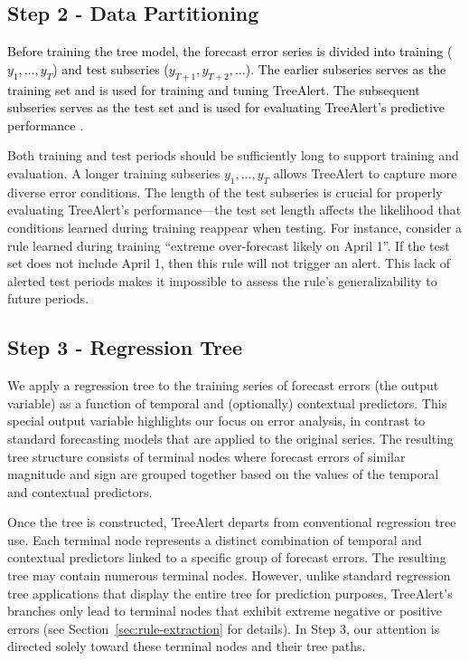 \documentclass[]{interact}
\newcommand{\matt}[1]{\textcolor{black}{#1}}
\theoremstyle{plain}
\theoremstyle{definition}
\theoremstyle{remark}
\begin{document}
\subsection{Step 2 - Data Partitioning}

\matt{Before training the tree model, the forecast error series is divided into training ($y_1, \ldots, y_T$) and test subseries ($y_{T+1}, y_{T+2}, \ldots$). The earlier subseries serves as the training set and is
used for training and tuning TreeAlert. The subsequent subseries serves as the test set and is used for evaluating TreeAlert's predictive performance \citep{shmueli2024}.}

Both training and test periods should be sufficiently long to support training and evaluation.
A longer training subseries $y_1, \ldots, y_T$ allows TreeAlert to capture more diverse error conditions.
The length of the test subseries is crucial for properly evaluating TreeAlert's performance---the test set length affects the likelihood that conditions learned during training reappear when testing. For instance, consider a rule learned during training ``extreme over-forecast likely on April 1''. If the test set does not include April 1, then this rule will not trigger an alert. This lack of alerted test periods makes it impossible to assess the rule's generalizability to future periods.

\subsection{Step 3 - Regression Tree}
We apply a regression tree to the training series of forecast errors (the output variable) as a function of temporal and (optionally) contextual predictors. This special output variable highlights our focus on error analysis, in contrast to standard forecasting models that are applied to the original series. The resulting tree structure consists of terminal nodes where forecast errors of similar magnitude and sign are grouped together based on the values of the temporal and contextual predictors.

Once the tree is constructed, TreeAlert departs from conventional regression tree use. Each terminal node represents a distinct combination of temporal and contextual predictors linked to a specific group of forecast errors. The resulting tree may contain numerous terminal nodes. However, unlike standard regression tree applications that display the entire tree for prediction purposes, TreeAlert's branches only lead to terminal nodes that exhibit extreme negative or positive errors (see Section~\ref{sec:rule-extraction} for details). In Step 3, our attention is directed solely toward these terminal nodes and their tree paths.
\end{document}
